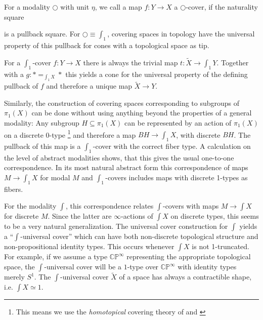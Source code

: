 \documentclass[9pt,twosided]{amsart}
\newcommand{\shape}{\int}
\newcommand{\drawpb}[1]{\arrow[#1, phantom, "\text{\scriptsize(pb)}" description]}
\newcommand{\CC}{\mathbb C}
\newcommand{\PP}{\mathbb P}
\begin{document}
For a modality $\bigcirc$ with unit $\eta$, we call a map $f:Y\to X$ a $\bigcirc$-cover, if the naturality square
\begin{center}
\end{center}
is a pullback square. 
For $\bigcirc\equiv\shape_1$, 
covering spaces in topology have the universal property of this pullback for cones with a topological space as tip.

For a $\shape_1$-cover $f:Y\to X$ there is always the trivial map $t:\widetilde{X}\to \shape_1Y$.
Together with a $g:\ast =_{\shape_1 X}\ast $ this yields a cone for the universal property of
the defining pullback of $f$ and therefore a unique map $\widetilde{X}\to Y$.

Similarly, the construction of covering spaces corresponding to subgroups of $\pi_1(X)$ 
can be done without using anything beyond the properties of a general modality:
Any subgroup $H\subseteq\pi_1(X)$ can be represented by an action of $\pi_1(X)$ on a discrete 0-type
\footnote{This means we use the \emph{homotopical} covering theory of \cite[Section 3.1]{favonia-thesis} 
and \cite[Section 7.1]{ulrik-egbert-floris-groups}}
and therefore a map $BH\to \shape_1X$, with discrete $BH$.
The pullback of this map is a $\shape_1$-cover with the correct fiber type.
A calculation on the level of abstract modalities shows, that this gives the usual one-to-one correspondence.
In its most natural abstract form this correspondence of maps $M\to \shape_1 X$ for modal $M$ 
and $\shape_1$-covers includes maps with discrete 1-types as fibers. 

For the modality $\shape$, this correspondence relates $\shape$-covers with 
maps $M\to \shape X$ for discrete $M$.
Since the latter are $\infty$-actions of $\shape X$ on discrete types, this seems to be a very natural generalization.
The universal cover construction for $\shape$ yields a ``$\shape$-universal cover'' 
which can have both non-discrete topological structure and
non-propositional identity types.
This occurs whenever $\shape X$ is not 1-truncated.
For example, if we assume a type $\CC\PP^\infty$ representing the appropriate topological space,
the $\shape$-universal cover will be a $1$-type over $\CC\PP^\infty$ with identity types merely $S^1$.
The $\shape$-universal cover $\widetilde{X}$ of a space has always a contractible shape, i.e. $\shape X \simeq 1$.
\end{document}
